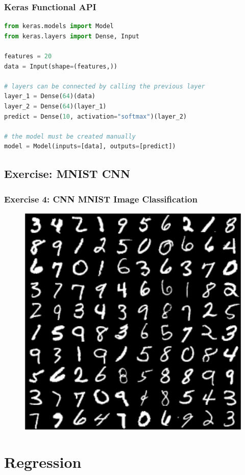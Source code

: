 \documentclass[aspectratio=1610]{beamer}
\begin{document}
\begin{frame}[fragile]
\frametitle{Keras Functional API}

\begin{lstlisting}[language=Python]
from keras.models import Model
from keras.layers import Dense, Input

features = 20
data = Input(shape=(features,))

# layers can be connected by calling the previous layer
layer_1 = Dense(64)(data)
layer_2 = Dense(64)(layer_1)
predict = Dense(10, activation="softmax")(layer_2)

# the model must be created manually
model = Model(inputs=[data], outputs=[predict])
\end{lstlisting}

\end{frame}

\subsection{Exercise: MNIST CNN}
\label{subsec:cnn-exercise}

\begin{frame}
\frametitle{Exercise 4: CNN MNIST Image Classification}

\begin{figure}
    \centering
    \includegraphics[width=0.4\linewidth]{mnist.png}
\end{figure}
\end{frame}

\section{Regression}
\label{sec:regression}
\end{document}
